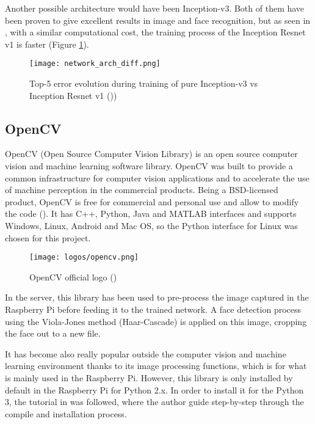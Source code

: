 	Another possible architecture would have been Inception-v3. Both of them have been proven to give excellent results in image and face recognition, but as seen in \cite{inception_resnet_article}, with a similar computational cost, the training process of the Inception Resnet v1 is faster (Figure \ref{fig:incep_arch_diff}).

	\begin{figure}[!ht]
		\centering
		\texttt{[image: network\_arch\_diff.png]}
		\caption{Top-5 error evolution during training of pure Inception-v3 vs Inception Resnet v1 (\cite{inception_resnet_article}))}
		\label{fig:incep_arch_diff}
	\end{figure}

	\subsection{OpenCV}
	\label{subsec:opencv}
	OpenCV (Open Source Computer Vision Library) is an open source computer vision and machine learning software library. OpenCV was built to provide a common infrastructure for computer vision applications and to accelerate the use of machine perception in the commercial products. Being a BSD-licensed product, OpenCV is free for commercial and personal use and allow to modify the code (\cite{opencv_about}). It has C++, Python, Java and MATLAB interfaces and supports Windows, Linux, Android and Mac OS, so the Python interface for Linux was chosen for this project. 

	\begin{figure}[!ht]
		\centering
		\vspace{0.2cm}
		\texttt{[image: logos/opencv.png]}
		\caption{OpenCV official logo (\cite{opencv_about})}
		\label{fig:opencv}
	\end{figure}	

	In the server, this library has been used to pre-process the image captured in the Raspberry Pi before feeding it to the trained network. A face detection process using the Viola-Jones method (Haar-Cascade) is applied on this image, cropping the face out to a new file. 

	It has become also really popular outside the computer vision and machine learning environment thanks to its image processing functions, which is for what is mainly used in the Raspberry Pi. However, this library is only installed by default in the Raspberry Pi for Python 2.x. In order to install it for the Python 3, the tutorial in \cite{opencv_for_python3} was followed, where the author guide step-by-step through the compile and installation process.

